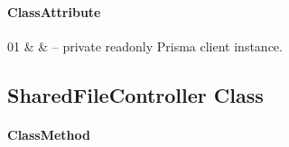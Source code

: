 \paragraph{ClassAttribute}
\begin{ClassAttributeTable}
01 &  &  -- private readonly Prisma client instance. \\ \hline
\end{ClassAttributeTable}

\subsection{SharedFileController Class}

\paragraph{ClassMethod}
